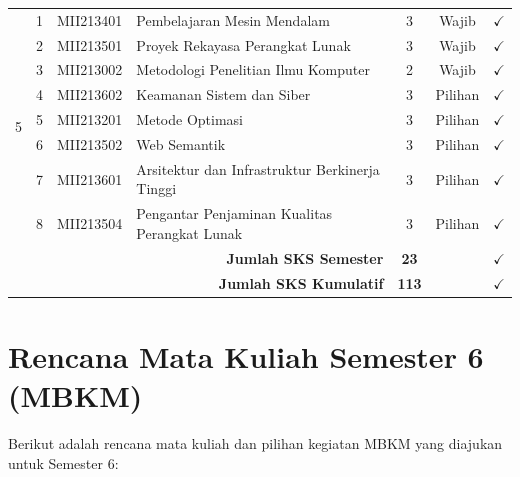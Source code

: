 \documentclass[a4paper,12pt]{article}
\begin{document}
\begin{longtable}{|c|c|l|p{6.5cm}|c|c|c|}
    \multirow{8}{*}{5} 
    & 1 & MII213401 & Pembelajaran Mesin Mendalam & 3 & Wajib & $\checkmark$ \\
    & 2 & MII213501 & Proyek Rekayasa Perangkat Lunak & 3 & Wajib & $\checkmark$ \\
    & 3 & MII213002 & Metodologi Penelitian Ilmu Komputer & 2 & Wajib & $\checkmark$ \\
    & 4 & MII213602 & Keamanan Sistem dan Siber & 3 & Pilihan & $\checkmark$ \\
    & 5 & MII213201 & Metode Optimasi & 3 & Pilihan & $\checkmark$ \\
    & 6 & MII213502 & Web Semantik & 3 & Pilihan & $\checkmark$ \\
    & 7 & MII213601 & Arsitektur dan Infrastruktur Berkinerja Tinggi & 3 & Pilihan & $\checkmark$ \\
    & 8 & MII213504 & Pengantar Penjaminan Kualitas Perangkat Lunak & 3 & Pilihan & $\checkmark$ \\
    \hline
    \multicolumn{4}{|r|}{\textbf{Jumlah SKS Semester}} & \textbf{23} & & $\checkmark$ \\
    \multicolumn{4}{|r|}{\textbf{Jumlah SKS Kumulatif}} & \textbf{113} & & $\checkmark$ \\
    \hline
\end{longtable}

\section{Rencana Mata Kuliah Semester 6 (MBKM)}

Berikut adalah rencana mata kuliah dan pilihan kegiatan MBKM yang diajukan untuk Semester 6:
\end{document}
